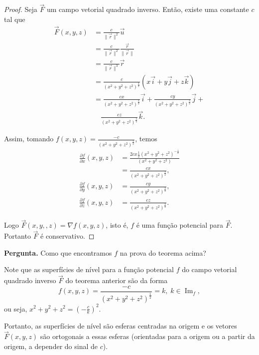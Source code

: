 \begin{proof}
    Seja \(\overrightarrow{F}\) um campo vetorial quadrado inverso. Então, existe uma constante \(c\) tal que
        \begin{align*}
            \overrightarrow{F}(x,y,z)
                & = \frac{c}{\|\overrightarrow{r}\|^2} \overrightarrow{u} \\
                & = \frac{c}{\|\overrightarrow{r}\|^2} \frac{\overrightarrow{r}}{\|\overrightarrow{r}\|} \\
                & = \frac{c}{\|\overrightarrow{r}\|^3} \overrightarrow{r} \\
                & = \frac{c}{(x^2 + y^2 + z^2)^{\frac{3}{2}}} (x\overrightarrow{i} + y\overrightarrow{j} + z\overrightarrow{k}) \\
                & = \frac{cx}{(x^2 + y^2 + z^2)^{\frac{3}{2}}}\overrightarrow{i} + \frac{cy}{(x^2 + y^2 + z^2)^{\frac{3}{2}}}\overrightarrow{j} + \\
                & \quad \frac{cz}{(x^2 + y^2 + z^2)^{\frac{3}{2}}}\overrightarrow{k}.
        \end{align*}

    Assim, tomando \(f(x,y,z) = \frac{-c}{(x^2 + y^2 + z^2)^{\frac{1}{2}}}\), temos
        \begin{align*}
            \frac{\partial f}{\partial x}(x,y,z)
                & = \frac{2cx\frac{1}{2}(x^2 + y^2 + z^2)^{-\frac{1}{2}}}{(x^2 + y^2 + z^2)}\\
                & = \frac{cx}{(x^2 + y^2 + z^2)^{\frac{3}{2}}},\\
            \frac{\partial f}{\partial y}(x,y,z)
                & = \frac{cy}{(x^2 + y^2 + z^2)^{\frac{3}{2}}},\\
            \frac{\partial f}{\partial z}(x,y,z)
                & = \frac{cz}{(x^2 + y^2 + z^2)^{\frac{3}{2}}}.
        \end{align*}

    Logo \(\overrightarrow{F}(x,y,,z) = \nabla f(x,y,z)\), isto é, \(f\) é uma função potencial para \(\overrightarrow{F}\). Portanto \(\overrightarrow{F}\) é conservativo.
\end{proof}

\textbf{Pergunta. } Como que encontramos \(f\) na prova do teorema acima?

\begin{remark}
    Note que as superfícies de nível para a função potencial \(f\) do campo vetorial quadrado inverso \(\overrightarrow{F}\) do teorema anterior são da forma \[f(x,y,z) = \frac{-c}{(x^2 + y^2 + z^2)^{\frac{1}{2}}} = k,\; k\in\operatorname{Im}_f,\] ou seja, \(x^2 + y^2 + z^2 = \left( -\frac{c}{k} \right)^2.\)

    Portanto, as superfícies de nível são esferas centradas na origem e os vetores \(\overrightarrow{F}(x,y,z)\) são ortogonais a essas esferas (orientadas para a origem ou a partir da origem, a depender do sinal de \(c\)).
\end{remark}

